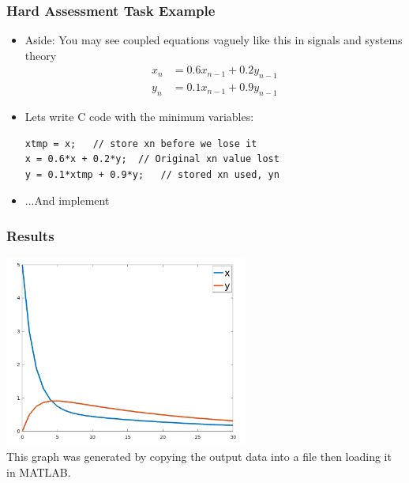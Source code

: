 \documentclass[14pt]{beamer}
\begin{document}
\begin{frame}[fragile]
\frametitle{Hard Assessment Task Example}
\begin{itemize}
\item Aside: You may see coupled equations vaguely like this in signals and systems theory
\begin{align*}
x_n &= 0.6x_{n-1} + 0.2y_{n-1}\\
y_n &= 0.1x_{n-1} + 0.9y_{n-1}
\end{align*}

\item Lets write C code with the minimum variables:
\begin{lstlisting}[style=pseudo]
xtmp = x;	// store xn before we lose it
x = 0.6*x + 0.2*y;	// Original xn value lost
y = 0.1*xtmp + 0.9*y;	// stored xn used, yn
\end{lstlisting}
\item ...And implement
\end{itemize}
\end{frame}

\begin{frame}
\frametitle{Results}
\begin{center}
\includegraphics[width=0.6\textwidth]{coupled}\\
{\small This graph was generated by copying the output data into a file then loading it in MATLAB.}
\end{center}
\end{frame}
\end{document}
